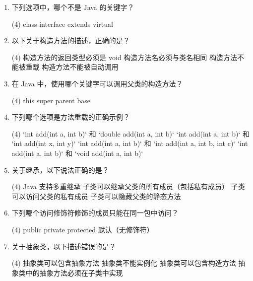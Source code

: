 \documentclass[a3paper, landscape, 11pt, twocolumn]{article}
\begin{document}
\begin{enumerate}[label=\arabic*., itemsep=0.8em]
	\item 下列选项中，哪个不是 Java 的关键字？
	      \begin{tasks}(4)
		      \task class \task interface \task extends \task virtual
	      \end{tasks}

	\item 以下关于构造方法的描述，正确的是？
	      \begin{tasks}(4)
		      \task 构造方法的返回类型必须是 void
		      \task 构造方法名必须与类名相同
		      \task 构造方法不能被重载
		      \task 构造方法不能被自动调用
	      \end{tasks}

	\item 在 Java 中，使用哪个关键字可以调用父类的构造方法？
	      \begin{tasks}(4)
		      \task this \task super \task parent \task base
	      \end{tasks}

	\item 下列哪个选项是方法重载的正确示例？
	      \begin{tasks}(4)
		      \task `int add(int a, int b)` 和 `double add(int a, int b)`
		      \task `int add(int a, int b)` 和 `int add(int x, int y)`
		      \task `int add(int a, int b)` 和 `int add(int a, int b, int c)`
		      \task `int add(int a, int b)` 和 `void add(int a, int b)`
	      \end{tasks}

	\item 关于继承，以下说法正确的是？
	      \begin{tasks}(4)
		      \task Java 支持多重继承
		      \task 子类可以继承父类的所有成员（包括私有成员）
		      \task 子类可以访问父类的私有成员
		      \task 子类可以隐藏父类的静态方法
	      \end{tasks}

	\item 下列哪个访问修饰符修饰的成员只能在同一包中访问？
	      \begin{tasks}(4)
		      \task public \task private \task protected \task 默认（无修饰符）
	      \end{tasks}

	\item 关于抽象类，以下描述错误的是？
	      \begin{tasks}(4)
		      \task 抽象类可以包含抽象方法
		      \task 抽象类不能实例化
		      \task 抽象类可以包含构造方法
		      \task 抽象类中的抽象方法必须在子类中实现
	      \end{tasks}


\end{enumerate}
\end{document}
